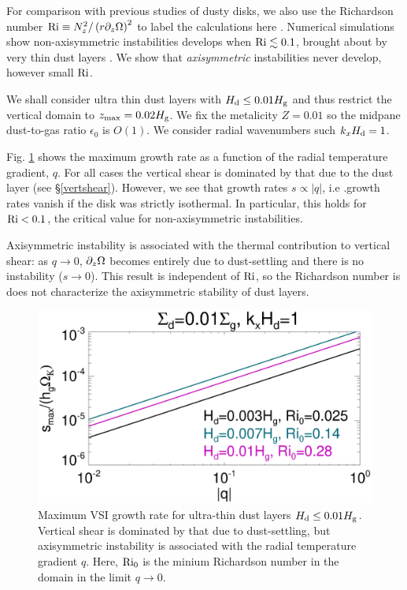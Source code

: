 For comparison with previous studies of dusty disks, we also use 
the Richardson number $\mathrm{Ri} \equiv N_z^2/\left(r\partial_z\Omega\right)^2$
to label the calculations here \citep{youdin02}.   
Numerical simulations show    
non-axisymmetric instabilities develops when $\mathrm{Ri}\lesssim0.1$, brought about
by very thin dust layers \citep{chiang08, lee10}. We show that \emph{axisymmetric}
instabilities never develop, however small $\mathrm{Ri}$. 

We shall consider ultra thin dust layers with $H_\mathrm{d}\leq 0.01H_\mathrm{g}$ and thus
restrict the vertical domain to $z_\mathrm{max} = 0.02H_\mathrm{g}$. We fix the 
metalicity $Z=0.01$ so the midpane dust-to-gas ratio $\epsilon_0$ is 
$O(1)$.  We consider radial wavenumbers such $k_xH_\mathrm{d}=1$. 

Fig. \ref{ultra_thin} shows the maximum growth rate  as a function of
the radial temperature gradient, $q$. For all cases the vertical
shear is dominated by that due to the dust layer (see
\S\ref{vertshear}). However, we see that growth rates $s\propto
|q|$, i.e .growth rates vanish if the disk was strictly isothermal. 
In particular, this holds for $\mathrm{Ri} < 0.1$, the critical value
for non-axisymmetric instabilities. 

Axisymmetric instability is associated with the thermal
contribution to vertical shear: as $q\to0$,  $\partial_z\Omega$ becomes
entirely due to dust-settling and there is no instability ($s\to
0$). This result is independent of $\mathrm{Ri}$, so the Richardson number
is does not characterize the axisymmetric stability of dust
layers. 

\begin{figure}
  \includegraphics[width=\linewidth]{figures/compare_eigenvals_thindust} 
  \caption{Maximum VSI growth rate for ultra-thin dust layers $H_\mathrm{d}
    \leq 0.01H_\mathrm{g}$. Vertical shear is dominated by that due to
    dust-settling, but axisymmetric instability is associated with the
    radial temperature gradient $q$. Here, $\mathrm{Ri}_0$ is the minium
    Richardson number in the domain in the limit $q\to0$. 
    \label{ultra_thin}
    }
\end{figure}




